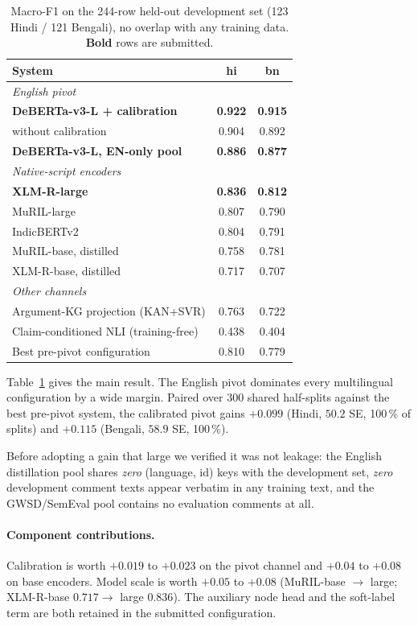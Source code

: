 \documentclass[twocolumn]{ceurart}
\begin{document}
\begin{table}[t]
\centering
\caption{Macro-F1 on the 244-row held-out development set (123 Hindi / 121
Bengali), no overlap with any training data. \textbf{Bold} rows are submitted.}
\label{tab:main}
\begin{tabular}{lcc}
\toprule
System & hi & bn \\
\midrule
\multicolumn{3}{l}{\emph{English pivot}} \\
\textbf{DeBERTa-v3-L + calibration} & \textbf{0.922} & \textbf{0.915} \\
\quad without calibration & 0.904 & 0.892 \\
\textbf{DeBERTa-v3-L, EN-only pool} & \textbf{0.886} & \textbf{0.877} \\
\midrule
\multicolumn{3}{l}{\emph{Native-script encoders}} \\
\textbf{XLM-R-large} & \textbf{0.836} & \textbf{0.812} \\
MuRIL-large & 0.807 & 0.790 \\
IndicBERTv2 & 0.804 & 0.791 \\
MuRIL-base, distilled & 0.758 & 0.781 \\
XLM-R-base, distilled & 0.717 & 0.707 \\
\midrule
\multicolumn{3}{l}{\emph{Other channels}} \\
Argument-KG projection (KAN+SVR) & 0.763 & 0.722 \\
Claim-conditioned NLI (training-free) & 0.438 & 0.404 \\
\midrule
Best pre-pivot configuration & 0.810 & 0.779 \\
\bottomrule
\end{tabular}
\end{table}

Table~\ref{tab:main} gives the main result. The English pivot dominates every
multilingual configuration by a wide margin. Paired over 300 shared half-splits
against the best pre-pivot system, the calibrated pivot gains
$+0.099$ (Hindi, $50.2$ SE, 100\,\% of splits) and $+0.115$ (Bengali,
$58.9$ SE, 100\,\%).

Before adopting a gain that large we verified it was not leakage: the English
distillation pool shares \emph{zero} (language, id) keys with the development
set, \emph{zero} development comment texts appear verbatim in any training text,
and the GWSD/SemEval pool contains no evaluation comments at all.

\paragraph{Component contributions.}
Calibration is worth $+0.019$ to $+0.023$ on the pivot channel and $+0.04$ to
$+0.08$ on base encoders. Model scale is worth $+0.05$ to $+0.08$
(MuRIL-base $\rightarrow$ large; XLM-R-base $0.717 \rightarrow$ large $0.836$).
The auxiliary node head and the soft-label term are both retained in the
submitted configuration.
\end{document}
